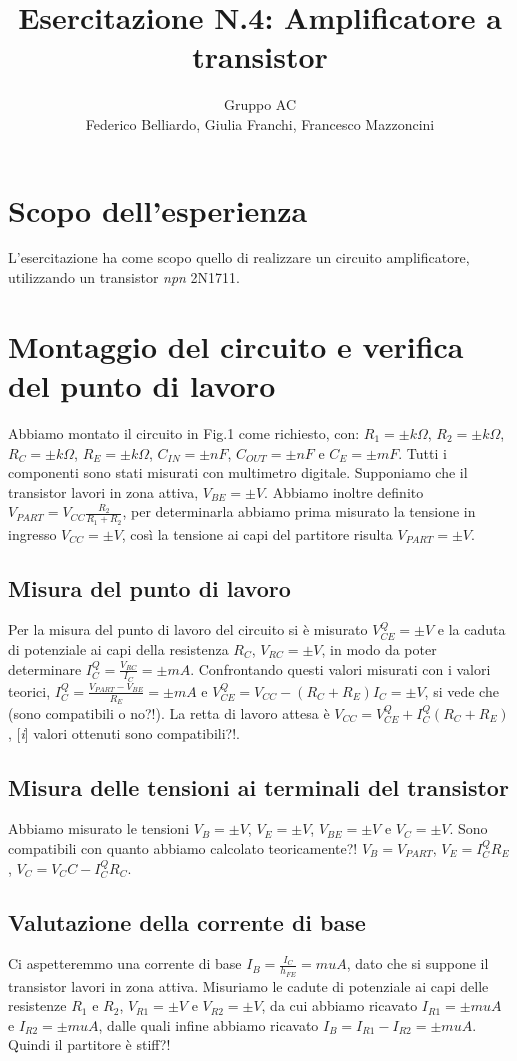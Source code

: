 \documentclass[10pt,a4paper]{article}
\author{Gruppo AC \\ Federico Belliardo, Giulia Franchi, Francesco Mazzoncini}
\title{Esercitazione N.4: Amplificatore a transistor}
\newcommand{\rem}[1]{[\emph{#1}]}
\begin{document}
\maketitle

\section{Scopo dell'esperienza}
L'esercitazione ha come scopo quello di realizzare un circuito amplificatore, utilizzando un transistor \textit{npn} 2N1711.

\section{Montaggio del circuito e verifica del punto di lavoro}
Abbiamo montato il circuito in Fig.1 come richiesto, con: $R_1= \pm k\Omega$, $R_2= \pm k\Omega$, $R_C= \pm k\Omega$, $R_E= \pm k\Omega$, $C_{IN}= \pm nF$, $C_{OUT}= \pm nF$ e $C_E= \pm mF$. Tutti i componenti sono stati misurati con multimetro digitale.
Supponiamo che il transistor lavori in zona attiva, $V_{BE}= \pm V$. Abbiamo inoltre definito $V_{PART}=V_{CC}\frac{R_2}{R_1+R_2}$, per determinarla abbiamo prima misurato la tensione in ingresso $V_{CC}= \pm V$, così la tensione ai capi del partitore risulta $V_{PART}= \pm V$.


\subsection{Misura del punto di lavoro}
Per la misura del punto di lavoro del circuito si è misurato $V_{CE}^Q= \pm V$ e la caduta di potenziale ai capi della resistenza $R_C$, $V_{RC}= \pm V$, in modo da poter determinare $I_C^Q=\frac{V_{RC}}{I_C}= \pm mA$. Confrontando questi valori misurati con i valori teorici, $I_C^Q=\frac{V_{PART}-V_{BE}}{R_E}= \pm mA$ e $V_{CE}^Q=V_{CC}-(R_C+R_E)I_C= \pm V$, si vede che (sono compatibili o no?!).
La retta di lavoro attesa è $V_{CC}=V_{CE}^Q+I_C^Q(R_C+R_E)$, \rem i valori ottenuti sono compatibili?!.

\subsection{Misura delle tensioni ai terminali del transistor}
Abbiamo misurato le tensioni $V_B= \pm V$, $V_E= \pm V$, $V_{BE}= \pm V$ e $V_C= \pm V$. Sono compatibili con quanto abbiamo calcolato teoricamente?! $V_B= V_{PART}$, $V_E=I_C^Q R_E$, $V_C=V_CC-I_C^Q R_C$.

\subsection{Valutazione della corrente di base}
Ci aspetteremmo una corrente di base $I_B=\frac{I_C}{h_{FE}}= muA$, dato che si suppone il transistor lavori in zona attiva. Misuriamo le cadute di potenziale ai capi delle resistenze $R_1$ e $R_2$, $V_{R1}= \pm V$ e $V_{R2}= \pm V$, da cui abbiamo ricavato $I_{R1}= \pm muA$ e $I_{R2}= \pm muA$, dalle quali infine abbiamo ricavato $I_B=I_{R1}-I_{R2}= \pm muA$. Quindi il partitore è stiff?!
\end{document}
